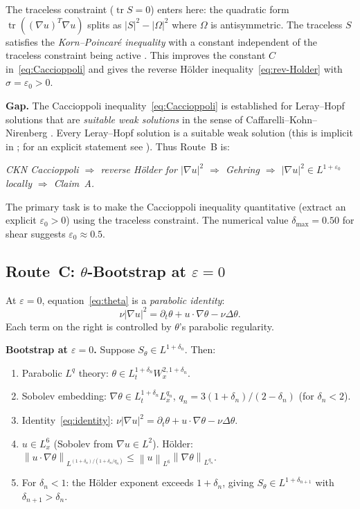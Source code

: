 \documentclass[11pt]{article}
\theoremstyle{definition}
\theoremstyle{remark}
\newcommand{\norm}[1]{\left\|#1\right\|}
\newcommand{\prt}{\partial_t}
\newcommand{\grad}{\nabla}
\newcommand{\Sth}{S_\theta}
\newcommand{\dlt}{\delta}
\newcommand{\eps}{\varepsilon}
\begin{document}
The traceless constraint ($\operatorname{tr}S=0$) enters here: the quadratic
form $\operatorname{tr}((\grad u)^T\grad u)$ splits as $|S|^2 - |\Omega|^2$
where $\Omega$ is antisymmetric.  The traceless $S$ satisfies the
\emph{Korn--Poincar\'e inequality} with a constant independent of the
traceless constraint being active \cite{Stein1970}.  This improves the
constant $C$ in~\eqref{eq:Caccioppoli} and gives the reverse H\"older
inequality~\eqref{eq:rev-Holder} with $\sigma=\eps_0>0$.

\textbf{Gap.} The Caccioppoli inequality~\eqref{eq:Caccioppoli} is established
for Leray--Hopf solutions that are \emph{suitable weak solutions} in the sense
of Caffarelli--Kohn--Nirenberg \cite{CKN1982}.  Every Leray--Hopf solution is
a suitable weak solution (this is implicit in \cite{CKN1982}; for an explicit
statement see \cite{Lin1998}).  Thus Route~B is:

\begin{center}
\emph{CKN Caccioppoli $\Rightarrow$ reverse H\"older for $|\grad u|^2$
$\Rightarrow$ Gehring $\Rightarrow$ $|\grad u|^2\in L^{1+\eps_0}$ locally
$\Rightarrow$ Claim~A.}
\end{center}

The primary task is to make the Caccioppoli inequality quantitative
(extract an explicit $\eps_0>0$) using the traceless constraint.  The
numerical value $\dlt_{\max}=0.50$ for shear suggests $\eps_0\approx 0.5$.

\subsection{Route~C: $\theta$-Bootstrap at $\eps=0$}
\label{sec:routeC}

At $\eps=0$, equation~\eqref{eq:theta} is a \emph{parabolic identity}:
\begin{equation}\label{eq:identity}
  \nu|\grad u|^2 = \prt\theta + u\cdot\grad\theta - \nu\Delta\theta.
\end{equation}
Each term on the right is controlled by $\theta$'s parabolic regularity.

\textbf{Bootstrap at $\eps=0$.}
Suppose $\Sth\in L^{1+\dlt_n}$.  Then:
\begin{enumerate}
\item Parabolic $L^q$ theory: $\theta\in L^{1+\dlt_n}_t W^{2,1+\dlt_n}_x$.
\item Sobolev embedding: $\grad\theta\in L^{1+\dlt_n}_t L^{q_n}_x$,
  $q_n = 3(1+\dlt_n)/(2-\dlt_n)$ (for $\dlt_n<2$).
\item Identity~\eqref{eq:identity}: $\nu|\grad u|^2 = \prt\theta + u\cdot\grad\theta
  - \nu\Delta\theta$.
\item $u\in L^6_x$ (Sobolev from $\grad u\in L^2$).
  H\"older: $\norm{u\cdot\grad\theta}_{L^{(1+\dlt_n)/(1+\dlt_n/q_n)}}
  \leq \norm{u}_{L^6}\norm{\grad\theta}_{L^{q_n}}$.
\item For $\dlt_n<1$: the H\"older exponent exceeds $1+\dlt_n$, giving
  $\Sth\in L^{1+\dlt_{n+1}}$ with $\dlt_{n+1}>\dlt_n$.
\end{enumerate}
\end{document}
